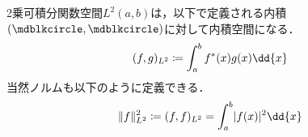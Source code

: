 \documentclass{sotsu}
\newif\ifdraft
\begin{document}
\begin{proposition}
    2乗可積分関数空間$L^2 (a, b)$は，以下で定義される内積$(\bigdot, \bigdot)$に対して内積空間になる．
    \begin{align}
        (f, g)_{L^2} \coloneq \int_a^b \conj{f}(x) g(x) \dd{x}
    \end{align}
    当然ノルムも以下のように定義できる．
    \begin{align}
        \norm{f}_{L^2}^2 \coloneq (f, f)_{L^2} = \int_a^b \abs{f(x)}^2 \dd{x}
    \end{align}
\end{proposition}












\printbibheading

\printbibliography[
    keyword=set,
    heading=subbibliography,
    title={集合論}
]
\printbibliography[
    keyword=lin, 
    heading=subbibliography, 
    title={線形代数}
]




\ifdraft
\else
    \printindex
\fi
\end{document}
